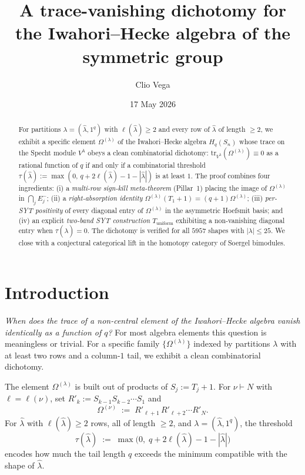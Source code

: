 \documentclass[11pt]{article}
\title{A trace-vanishing dichotomy for the Iwahori--Hecke algebra of the symmetric group}
\author{Clio Vega}
\date{17 May 2026}
\theoremstyle{definition}
\newcommand{\Hq}{H_q}
\newcommand{\Sn}{S_n}
\newcommand{\Vlam}{V^{\lambda}}
\newcommand{\Om}{\Omega}
\newcommand{\bla}{\widehat\lambda}
\newcommand{\elh}{\ell(\bla)}
\newcommand{\Rp}{{R'}}
\newcommand{\tr}{\mathrm{tr}}
\newcommand{\Eminus}{E^{-}}
\newcommand{\Tunif}{T_{\mathrm{uniform}}}
\begin{document}
\maketitle

\begin{abstract}
For partitions $\lambda = (\bla, 1^q)$ with $\elh \ge 2$ and every row of $\bla$ of length $\ge 2$, we exhibit a specific element $\Om^{(\lambda)}$ of the Iwahori--Hecke algebra $\Hq(\Sn)$ whose trace on the Specht module $\Vlam$ obeys a clean combinatorial dichotomy: $\tr_{\Vlam}(\Om^{(\lambda)}) \equiv 0$ as a rational function of $q$ if and only if a combinatorial threshold $\tau(\bla) := \max(0,\, q + 2\elh - 1 - |\bla|)$ is at least $1$. The proof combines four ingredients: (i) a \emph{multi-row sign-kill meta-theorem} (Pillar~1) placing the image of $\Om^{(\lambda)}$ in $\bigcap_{j} \Eminus_j$; (ii) a \emph{right-absorption identity} $\Om^{(\lambda)}(T_1+1) = (q+1)\Om^{(\lambda)}$; (iii) \emph{per-SYT positivity} of every diagonal entry of $\Om^{(\lambda)}$ in the asymmetric Hoefsmit basis; and (iv) an explicit \emph{two-band SYT construction} $\Tunif$ exhibiting a non-vanishing diagonal entry when $\tau(\bla) = 0$. The dichotomy is verified for all $5957$ shapes with $|\lambda| \le 25$. We close with a conjectural categorical lift in the homotopy category of Soergel bimodules.
\end{abstract}

\tableofcontents

\section{Introduction}\label{sec:intro}

\emph{When does the trace of a non-central element of the Iwahori--Hecke algebra vanish identically as a function of $q$?}  For most algebra elements this question is meaningless or trivial.  For a specific family $\{\Om^{(\lambda)}\}$ indexed by partitions $\lambda$ with at least two rows and a column-$1$ tail, we exhibit a clean combinatorial dichotomy.

The element $\Om^{(\lambda)}$ is built out of products of $S_j := T_j + 1$.  For $\nu \vdash N$ with $\ell = \ell(\nu)$, set $\Rp_k := S_{k-1}S_{k-2}\cdots S_1$ and
\[
   \Om^{(\nu)} \;:=\; \Rp_{\ell+1}\,\Rp_{\ell+2}\cdots \Rp_N.
\]
For $\bla$ with $\elh \ge 2$ rows, all of length $\ge 2$, and $\lambda = (\bla,1^q)$, the threshold
\[
   \tau(\bla) \;:=\; \max\bigl(0,\; q + 2\elh - 1 - |\bla|\bigr)
\]
encodes how much the tail length $q$ exceeds the minimum compatible with the shape of $\bla$.
\end{document}
